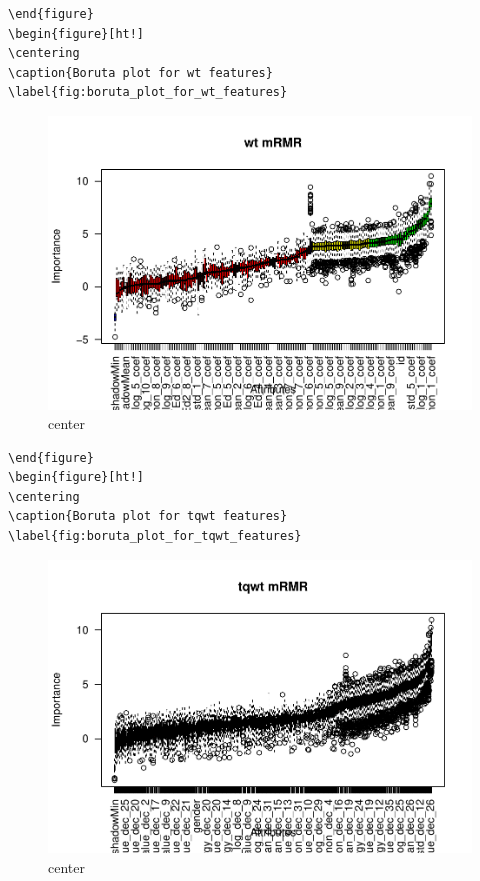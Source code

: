 \documentclass[
]{article}
\begin{document}
\begin{verbatim}
\end{figure}
\begin{figure}[ht!]
\centering
\caption{Boruta plot for wt features}
\label{fig:boruta_plot_for_wt_features}
\end{verbatim}

\begin{figure}
\includegraphics[width=1\linewidth,height=1\textheight]{figure/unnamed-chunk-7-6} \caption{center}\label{fig:unnamed-chunk-7-6}
\end{figure}

\begin{verbatim}
\end{figure}
\begin{figure}[ht!]
\centering
\caption{Boruta plot for tqwt features}
\label{fig:boruta_plot_for_tqwt_features}
\end{verbatim}

\begin{figure}
\includegraphics[width=1\linewidth,height=1\textheight]{figure/unnamed-chunk-7-7} \caption{center}\label{fig:unnamed-chunk-7-7}
\end{figure}
\end{document}
